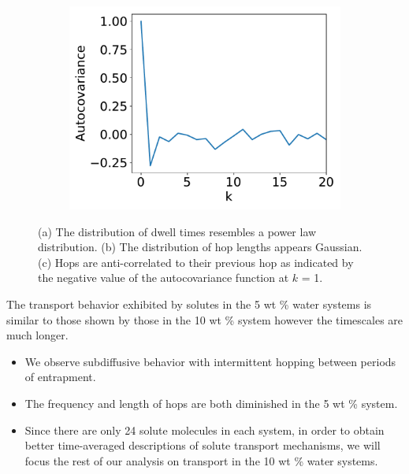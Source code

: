\documentclass{article}
\begin{document}
\begin{figure}
\begin{subfigure}{0.325\textwidth}
  \includegraphics[width=\linewidth]{example_autocovariance.pdf}
  \caption{}\label{fig:example_autocovariance}
  \end{subfigure}
  \caption{(a) The distribution of dwell times resembles a power law distribution. 
  (b) The distribution of hop lengths appears Gaussian. (c) Hops are anti-correlated
  to their previous hop as indicated by the negative value of the autocovariance 
  function at $k$ = 1.}\label{fig:examples}
  \end{figure}
  
  \noindent The transport behavior exhibited by solutes in the 5 wt \% water systems
  is similar to those shown by those in the 10 wt \% system however the timescales are
  much longer.
  \begin{itemize}
    \item We observe subdiffusive behavior with intermittent hopping between
    periods of entrapment.
    \item The frequency and length of hops are both diminished in the 5 wt \% system.
    \item Since there are only 24 solute molecules in each system, in order to obtain
    better time-averaged descriptions of solute transport mechanisms, we will focus
    the rest of our analysis on transport in the 10 wt \% water systems.
  \end{itemize}
  
  
\end{document}
